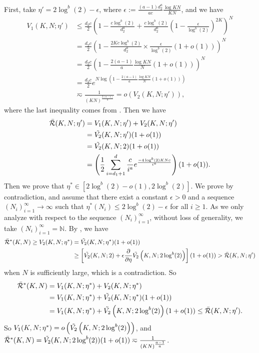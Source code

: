 First, take $\eta' = 2 \log^b(2)-\epsilon$, where $\epsilon := \frac{(a-1)d_2^{a}}{ac}\frac{\log KN}{KN}$, and we have
    \begin{align*}
        V_1(K, N; \eta') &\leq \frac{d_2c}{2}\left(1-\frac{c\log^b(2)}{d_2^{a}}+\frac{c\log^b(2)}{d_2^{a}}\left(1-\frac{\epsilon}{\log^b(2)}\right)^{2K}\right)^N \\
        &=\frac{d_2c}{2}\left(1-\frac{2Kc\log^b(2)}{d_2^{a}}\times\frac{\epsilon}{\log^b(2)}(1+o(1))\right)^N \\
        &=\frac{d_2c}{2}\left(1-\frac{2(a-1)}{a}\frac{\log KN}{N}(1+o(1))\right)^N \\
        &=\frac{d_2c}{2}e^{N\log\left(1-\frac{2(a-1)}{a}\frac{\log KN}{N}(1+o(1))\right)} \\
        &\eqsim \frac{1}{(KN)^{\frac{2(a-1)}{a}}} =o(V_2(K, N;\eta')),
    \end{align*}
    where the last inequality comes from . Then we have
    \begin{align*}
        \Bar{\mathcal{R}}(K, N;\eta')&=V_1(K, N;\eta')+V_2(K, N;\eta') \\
        &=\Tilde{V_2}(K, N;\eta')(1+o(1)) \\
        &=\Tilde{V_2}(K, N;2)(1+o(1)) \\
        &=\left(\frac{1}{2}\sum_{i=d_1+1}^{d}\frac{c}{i^{a}}e^{\frac{-4\log^b(2)KNc}{i^{a}}}\right)(1+o(1)).
    \end{align*}
    Then we prove that $\eta^* \in [2 \log^b(2)-o(1), 2 \log^b(2)]$.
    We prove by contradiction, and assume that there exist a constant $\epsilon>0$ and a sequence $(N_i)_{i=1}^{\infty}\to \infty$ such that $\eta^*(N_i)\leq 2 \log^b(2)-\epsilon$ for all $i\geq 1$. As we only analyze with respect to the sequence $(N_i)_{i=1}^{\infty}$, without loss of generality, we take $(N_i)_{i=1}^{\infty}=\mathds{N}$. By , we have 
    \begin{align*}
        \Bar{\mathcal{R}}^*(K, N)\geq V_2(K, N;\eta^*)&=\Tilde{V_2}(K, N; \eta^*)(1+o(1)) \\
        &\geq\left[\Tilde{V_2}(K, N;2)+\epsilon\frac{\partial}{\partial \eta}\Tilde{V_2}\left(K, N; 2 \log^b(2)\right)\right](1+o(1))>\Bar{\mathcal{R}}(K, N;\eta')
    \end{align*}
    when $N$ is sufficiently large, which is a contradiction.
    So
    \begin{align*}
        \Bar{\mathcal{R}}^*(K, N)&=V_1(K, N;\eta^*)+V_2(K, N;\eta^*) \\
        &=V_1(K, N;\eta^*)+\Tilde{V_2}(K, N;\eta^*)(1+o(1)) \\
        &=V_1(K, N;\eta^*)+\Tilde{V_2}\left(K, N;2 \log^b(2)\right)(1+o(1))\leq\Bar{\mathcal{R}}(K, N;\eta').
    \end{align*}
    So $V_1(K, N;\eta^*)=o\left(\Tilde{V_2}\left(K, N;2 \log^b(2)\right)\right)$, and $\Bar{\mathcal{R}}^*(K, N)=\Tilde{V_2}(K, N;2\log^b(2))(1+o(1)) \eqsim \frac{1}{(KN)^{\frac{a-1}{a}}}$.

